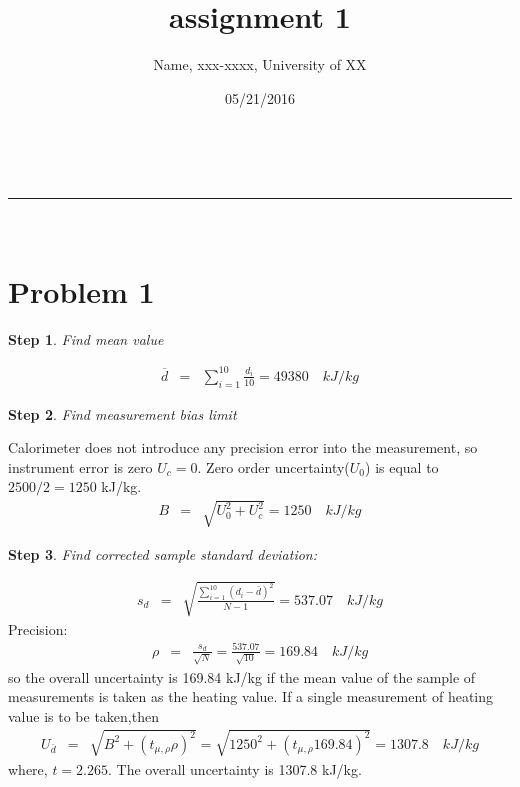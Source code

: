 \documentclass[a4paper,11pt]{article}
\makeatletter
\newcommand{\linia}{\rule{\linewidth}{2pt}}
\theoremstyle{mytheor}
\newtheorem{defi}{Step}
\renewcommand{\maketitle}{
\begin{center}
\vspace{2ex}
{\huge \textsc{\@title}}
\vspace{1ex}
\\
\linia\\
\@author \hfill \@date
\vspace{4ex}
\end{center}
}
\makeatother
\begin{document}
\title{assignment 1}

\author{Name, \textnumero{}xxx-xxxx, University of XX}

\date{05/21/2016}

\maketitle
\section{Problem 1}
\begin{defi}
Find mean value
\end{defi}
\begin{equation}
    \begin{array}{rcl}
           \overline{d} & = &  \displaystyle\sum\limits_{i=1}^{10} \frac{d_i}{10} 
              =   49380 \quad kJ/kg
    \end{array}
\end{equation}
\begin{defi}
Find measurement bias limit
\end{defi}
Calorimeter does not introduce any precision error into the measurement, so instrument error is zero $U_c = 0$. Zero order uncertainty($U_0$) is equal to $2500/2 = 1250$ kJ/kg.
\begin{equation}
    \begin{array}{rcl}
           B & = &  \sqrt{U^2_0 + U^2_c} = 1250 \quad kJ/kg
    \end{array}
\end{equation}
\begin{defi}
Find corrected sample standard deviation:
\end{defi}
\begin{equation}
    \begin{array}{rcl}
           s_d & = &  \sqrt{\frac{\sum\limits_{i=1}^{10}(d_i-\bar{d})^2}{N-1}} = 537.07 \quad kJ/kg
    \end{array}
\end{equation}
Precision: 
\begin{equation}
    \begin{array}{rcl}
           \rho & = & \frac{s_d}{\sqrt{N}} = \frac{537.07}{\sqrt{10}} = 169.84 \quad kJ/kg
    \end{array}
\end{equation}
so the overall uncertainty is 169.84 kJ/kg if the mean value of the sample of measurements is taken as the heating value.
If a single measurement of heating value is to be taken,then 
\begin{equation}
    \begin{array}{rcl}
           U_{\bar{d}} & = & \sqrt{B^2+(t_{\mu,\rho} \rho)^2} = \sqrt{1250^2+(t_{\mu,\rho} 169.84)^2}= 1307.8 \quad kJ/kg
    \end{array}
\end{equation}
where, $ t = 2.265$.
The overall uncertainty is 1307.8 kJ/kg. 
\end{document}
